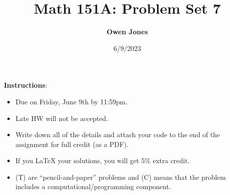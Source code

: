 \documentclass[12pt]{article}
\title{\bf Math 151A: Problem Set 7}
\date{ 6/9/2023}
\author{\bf Owen Jones}
\begin{document}
\maketitle


{\small \textbf{Instructions}:
\begin{itemize}
\item Due on Friday, June 9th by 11:59pm.
\item Late HW will not be accepted.
\item Write down all of the details and attach your code to the end of the assignment for full credit (as a PDF).  
\item If you LaTeX your solutions, you will get $5\%$ extra credit. 
\item (T) are ``pencil-and-paper'' problems and (C) means that the problem includes a computational/programming component. 
\end{itemize}}

\vspace{1em}
\end{document}
